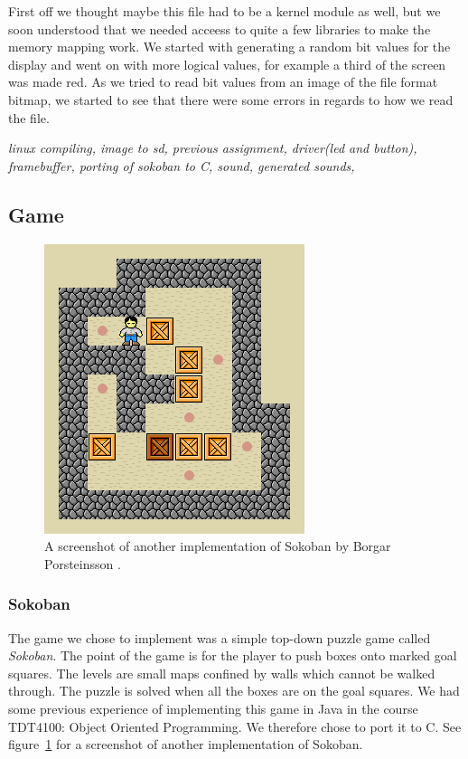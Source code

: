 \documentclass[a4paper,11pt]{article}
\begin{document}
First off we thought maybe this file had to be a kernel module as well, but we soon understood that we needed acceess to quite a few libraries to make the memory mapping work. We started with generating a random bit values for the display and went on with more logical values, for example a third of the screen was made red. As we tried to read bit values from an image of the file format bitmap, we started to see that there were some errors in regards to how we read the file. 

\emph{linux compiling, image to sd, previous assignment, driver(led and button), framebuffer, porting of sokoban to C, sound, generated sounds, }

\subsection{Game}
\begin{figure}
\centering
\includegraphics{images/sokoban.png}
\caption{A screenshot of another implementation of Sokoban by Borgar Porsteinsson \cite{sokobanscreen}.}
\label{fig:sokobanimage}
\end{figure}

\subsubsection{Sokoban}
The game we chose to implement was a simple top-down puzzle game called \textit{Sokoban}\cite{sokoban}. The point of the game is for the player to push boxes onto marked goal squares. The levels are small maps confined by walls which cannot be walked through. The puzzle is solved when all the boxes are on the goal squares. We had some previous experience of implementing this game in Java in the course TDT4100: Object Oriented Programming. We therefore chose to port it to C. See figure~\ref{fig:sokobanimage} for a screenshot of another implementation of Sokoban.
\end{document}
